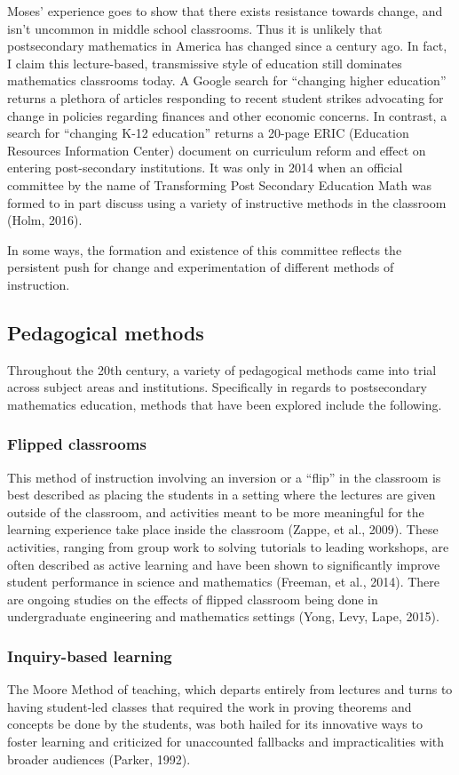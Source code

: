 Moses' experience goes to show that there exists resistance towards change, and isn't uncommon in middle school classrooms. Thus it is unlikely that postsecondary mathematics in America has changed since a century ago. In fact, I claim this lecture-based, transmissive style of education still dominates mathematics classrooms today. A Google search for ``changing higher education'' returns a plethora of articles responding to recent student strikes advocating for change in policies regarding finances and other economic concerns. In contrast, a search for ``changing K-12 education'' returns a 20-page ERIC (Education Resources Information Center) document on curriculum reform and effect on entering post-secondary institutions. It was only in 2014 when an official committee by the name of Transforming Post Secondary Education Math was formed to in part discuss using a variety of instructive methods in the classroom (Holm, 2016).

In some ways, the formation and existence of this committee reflects the  persistent push for change and experimentation of different methods of instruction.
\subsection{Pedagogical methods}
Throughout the 20th century, a variety of pedagogical methods came into trial across subject areas and institutions. Specifically in regards to postsecondary mathematics education, methods that have been explored include the following.

\subsubsection{Flipped classrooms}
This method of instruction involving an inversion or a ``flip'' in the classroom is best described as placing the students in a setting where the lectures are given outside of the classroom, and activities meant to be more meaningful for the learning experience take place inside the classroom (Zappe, et al., 2009). These activities, ranging from group work to solving tutorials to leading workshops, are often described as active learning and have been shown to significantly improve student performance in science and mathematics (Freeman, et al., 2014). There are ongoing studies on the effects of flipped classroom being done in undergraduate engineering and mathematics settings (Yong, Levy, Lape, 2015).

\subsubsection{Inquiry-based learning}
The Moore Method of teaching, which departs entirely from lectures and turns to having student-led classes that required the work in proving theorems and concepts be done by the students, was both hailed for its innovative ways to foster learning and criticized for unaccounted fallbacks and impracticalities with broader audiences (Parker, 1992).

